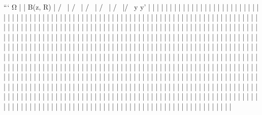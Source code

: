 ```
Ω
  |
  |       B(z, R)
  |     /     \
  |    /       \
  |   /         \
  |  /           \
  | /             \
  |/               \
  y                 y'
  |
  |
  |
  |
  |
  |
  |
  |
  |
  |
  |
  |
  |
  |
  |
  |
  |
  |
  |
  |
  |
  |
  |
  |
  |
  |
  |
  |
  |
  |
  |
  |
  |
  |
  |
  |
  |
  |
  |
  |
  |
  |
  |
  |
  |
  |
  |
  |
  |
  |
  |
  |
  |
  |
  |
  |
  |
  |
  |
  |
  |
  |
  |
  |
  |
  |
  |
  |
  |
  |
  |
  |
  |
  |
  |
  |
  |
  |
  |
  |
  |
  |
  |
  |
  |
  |
  |
  |
  |
  |
  |
  |
  |
  |
  |
  |
  |
  |
  |
  |
  |
  |
  |
  |
  |
  |
  |
  |
  |
  |
  |
  |
  |
  |
  |
  |
  |
  |
  |
  |
  |
  |
  |
  |
  |
  |
  |
  |
  |
  |
  |
  |
  |
  |
  |
  |
  |
  |
  |
  |
  |
  |
  |
  |
  |
  |
  |
  |
  |
  |
  |
  |
  |
  |
  |
  |
  |
  |
  |
  |
  |
  |
  |
  |
  |
  |
  |
  |
  |
  |
  |
  |
  |
  |
  |
  |
  |
  |
  |
  |
  |
  |
  |
  |
  |
  |
  |
  |
  |
  |
  |
  |
  |
  |
  |
  |
  |
  |
  |
  |
  |
  |
  |
  |
  |
  |
  |
  |
  |
  |
  |
  |
  |
  |
  |
  |
  |
  |
  |
  |
  |
  |
  |
  |
  |
  |
  |
  |
  |
  |
  |
  |
  |
  |
  |
  |
  |
  |
  |
  |
  |
  |
  |
  |
  |
  |
  |
  |
  |
  |
  |
  |
  |
  |
  |
  |
  |
  |
  |
  |
  |
  |
  |
  |
  |
  |
  |
  |
  |
  |
  |
  |
  |
  |
  |
  |
  |
  |
  |
  |
  |
  |
  |
  |
  |
  |
  |
  |
  |
  |
  |
  |
  |
  |
  |
  |
  |
  |
  |
  |
  |
  |
  |
  |
  |
  |
  |
  |
  |
  |
  |
  |
  |
  |
  |
  |
  |
  |
  |
  |
  |
  |
  |
  |
  |
  |
  |
  |
  |
  |
  |
  |
  |
  |
  |
  |
  |
  |
  |
  |
  |
  |
  |
  |
  |
  |
  |
  |
  |
  |
  |
  |
  |
  |
  |
  |
  |
  |
  |
  |
  |
  |
  |
  |
  |
  |
  |
  |
  |
  |
  |
  |
  |
  |
  |
  |
  |
  |
  |
  |
  |
  |
  |
  |
  |
  |
  |
  |
  |
  |
  |
  |
  |
  |
  |
  |
  |
  |
  |
  |
  |
  |
  |
  |
  |
  |
  |
  |
  |
  |
  |
  |
  |
  |
  |
  |
  |
  |
  |
  |
  |
  |
  |
  |
  |
  |
  |
  |
  |
  |
  |
  |
  |
  |
  |
  |
  |
  |
  |
  |
  |
  |
  |
  |
  |
  |
  |
  |
  |
  |
  |
  |
  |
  |
  |
  |
  |
  |
  |
  |
  |
  |
  |
  |
  |
  |
  |
  |
  |
  |
  |
  |
  |
  |
  |
  |
  |
  |
  |
  |
  |
  |
  |
  |
  |
  |
  |
  |
  |
  |
  |
  |
  |
  |
  |
  |
  |
  |
  |
  |
  |
  |
  |
  |
  |
  |
  |
  |
  |
  |
  |
  |
  |
  |
  |
  |
  |
  |
  |
  |
  |
  |
  |
  |
  |
  |
  |
  |
  |
  |
  |
  |
  |
  |
  |
  |
  |
  |
  |
  |
  |
  |
  |
  |
  |
  |
  |
  |
  |
  |
  |
  |
  |
  |
  |
  |
  |
  |
  |
  |
  |
  |
  |
  |
  |
  |
  |
  |
  |
  |
  |
  |
  |
  |
  |
  |
  |
  |
  |
  |
  |
  |
  |
  |
  |
  |
  |
  |
  |
  |
  |
  |
  |
  |
  |
  |
  |
  |
  |
  |
  |
  |
  |
  |
  |
  |
  |
  |
  |
  |
